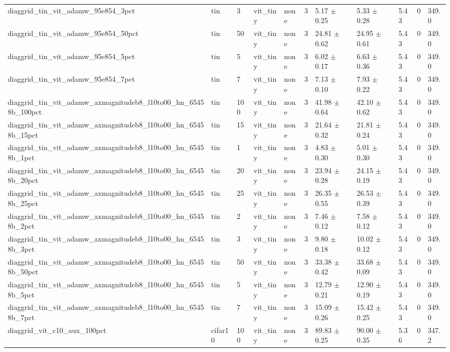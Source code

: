 \begin{tabular}{lllllllllll}
diaggrid_tin_vit_adamw_95e854_3pct & tin & 3 & vit_tiny & none & 3 & 5.17 $\pm$ 0.25 & 5.33 $\pm$ 0.28 & 5.43 & 0 & 349.0 \\
diaggrid_tin_vit_adamw_95e854_50pct & tin & 50 & vit_tiny & none & 3 & 24.81 $\pm$ 0.62 & 24.95 $\pm$ 0.61 & 5.43 & 0 & 349.0 \\
diaggrid_tin_vit_adamw_95e854_5pct & tin & 5 & vit_tiny & none & 3 & 6.02 $\pm$ 0.17 & 6.63 $\pm$ 0.36 & 5.43 & 0 & 349.0 \\
diaggrid_tin_vit_adamw_95e854_7pct & tin & 7 & vit_tiny & none & 3 & 7.13 $\pm$ 0.10 & 7.93 $\pm$ 0.22 & 5.43 & 0 & 349.0 \\
diaggrid_tin_vit_adamw_axmagnitudeb8_l10to00_hn_65458b_100pct & tin & 100 & vit_tiny & none & 3 & 41.98 $\pm$ 0.64 & 42.10 $\pm$ 0.62 & 5.43 & 0 & 349.0 \\
diaggrid_tin_vit_adamw_axmagnitudeb8_l10to00_hn_65458b_15pct & tin & 15 & vit_tiny & none & 3 & 21.64 $\pm$ 0.32 & 21.81 $\pm$ 0.24 & 5.43 & 0 & 349.0 \\
diaggrid_tin_vit_adamw_axmagnitudeb8_l10to00_hn_65458b_1pct & tin & 1 & vit_tiny & none & 3 & 4.83 $\pm$ 0.30 & 5.01 $\pm$ 0.30 & 5.43 & 0 & 349.0 \\
diaggrid_tin_vit_adamw_axmagnitudeb8_l10to00_hn_65458b_20pct & tin & 20 & vit_tiny & none & 3 & 23.94 $\pm$ 0.28 & 24.15 $\pm$ 0.19 & 5.43 & 0 & 349.0 \\
diaggrid_tin_vit_adamw_axmagnitudeb8_l10to00_hn_65458b_25pct & tin & 25 & vit_tiny & none & 3 & 26.35 $\pm$ 0.55 & 26.53 $\pm$ 0.39 & 5.43 & 0 & 349.0 \\
diaggrid_tin_vit_adamw_axmagnitudeb8_l10to00_hn_65458b_2pct & tin & 2 & vit_tiny & none & 3 & 7.46 $\pm$ 0.12 & 7.58 $\pm$ 0.12 & 5.43 & 0 & 349.0 \\
diaggrid_tin_vit_adamw_axmagnitudeb8_l10to00_hn_65458b_3pct & tin & 3 & vit_tiny & none & 3 & 9.80 $\pm$ 0.18 & 10.02 $\pm$ 0.12 & 5.43 & 0 & 349.0 \\
diaggrid_tin_vit_adamw_axmagnitudeb8_l10to00_hn_65458b_50pct & tin & 50 & vit_tiny & none & 3 & 33.38 $\pm$ 0.42 & 33.68 $\pm$ 0.09 & 5.43 & 0 & 349.0 \\
diaggrid_tin_vit_adamw_axmagnitudeb8_l10to00_hn_65458b_5pct & tin & 5 & vit_tiny & none & 3 & 12.79 $\pm$ 0.21 & 12.90 $\pm$ 0.19 & 5.43 & 0 & 349.0 \\
diaggrid_tin_vit_adamw_axmagnitudeb8_l10to00_hn_65458b_7pct & tin & 7 & vit_tiny & none & 3 & 15.09 $\pm$ 0.26 & 15.42 $\pm$ 0.25 & 5.43 & 0 & 349.0 \\
diaggrid_vit_c10_aux_100pct & cifar10 & 100 & vit_tiny & none & 3 & 89.83 $\pm$ 0.25 & 90.00 $\pm$ 0.35 & 5.36 & 0 & 347.2 \\

\end{tabular}
